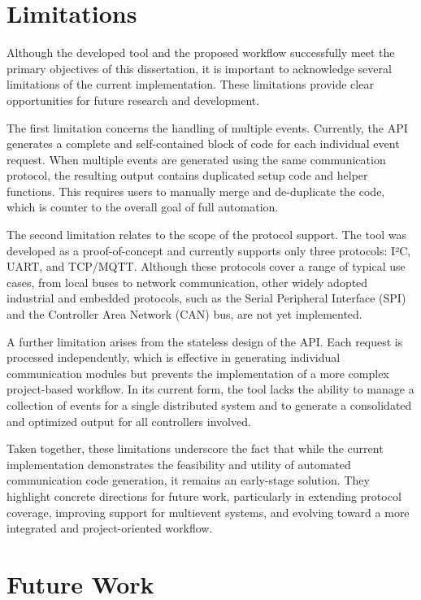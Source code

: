 \section{Limitations}
\label{sec:limitations}

Although the developed tool and the proposed workflow successfully meet the primary objectives of this dissertation, it is important to acknowledge several limitations of the current implementation. These limitations provide clear opportunities for future research and development. 

The first limitation concerns the handling of multiple events. Currently, the API generates a complete and self-contained block of code for each individual event request. When multiple events are generated using the same communication protocol, the resulting output contains duplicated setup code and helper functions. This requires users to manually merge and de-duplicate the code, which is counter to the overall goal of full automation.

The second limitation relates to the scope of the protocol support. The tool was developed as a proof-of-concept and currently supports only three protocols: I²C, UART, and TCP/MQTT. Although these protocols cover a range of typical use cases, from local buses to network communication, other widely adopted industrial and embedded protocols, such as the Serial Peripheral Interface (SPI) and the Controller Area Network (CAN) bus, are not yet implemented.

A further limitation arises from the stateless design of the API. Each request is processed independently, which is effective in generating individual communication modules but prevents the implementation of a more complex project-based workflow. In its current form, the tool lacks the ability to manage a collection of events for a single distributed system and to generate a consolidated and optimized output for all controllers involved.

Taken together, these limitations underscore the fact that while the current implementation demonstrates the feasibility and utility of automated communication code generation, it remains an early-stage solution. They highlight concrete directions for future work, particularly in extending protocol coverage, improving support for multievent systems, and evolving toward a more integrated and project-oriented workflow.



\section{Future Work}
\label{sec:future_work}

